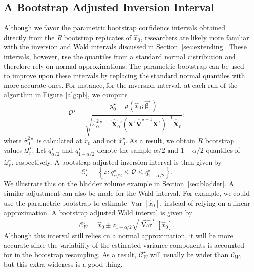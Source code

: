\documentclass[useAMS,usenatbib,usegraphicx,referee]{biom}\usepackage[]{graphicx}\usepackage[]{color}
\newcommand{\var}{\operatorname{Var}}
\newcommand{\trans}{\ensuremath{^\prime}}
\newcommand{\boot}{\star}
\newcommand{\X}{\ensuremath{\bm{X}}}
\begin{document}
\subsection{A Bootstrap Adjusted Inversion Interval}
\label{sec:inversion-adjusted}
Although we favor the parametric bootstrap confidence intervals obtained directly from the $R$ bootstrap replicates of $\widehat{x}_0$, researchers are likely more familiar with the inversion and Wald intervals discussed in Section~\ref{sec:extending}. These intervals, however, use the quantiles from a standard normal distribution and therefore rely on normal approximations. The parametric bootstrap can be used to improve upon these intervals by replacing the standard normal quantiles with more accurate ones. For instance, for the inversion interval, at each run of the algorithm in Figure~\ref{alg:pb}, we compute
\[
  \mathcal{Q}^\boot = \frac{y_0^\boot - \mu\left(\widehat{x}_0; \widehat{\bm{\beta}}^\boot\right)}{\sqrt{\widehat{\sigma}_0^{2\boot} + \widehat{\X}_0\trans\left(\X\trans\widehat{\bm{V}}^{\boot-1}\X\trans\right)^{-1}\widehat{\X}_0}},
\]
where $\widehat{\sigma}_0^{2\boot}$ is calculated at $\widehat{x}_0$ and not $\widehat{x}_0^\boot$. As a result, we obtain $R$ bootstrap values $\mathcal{Q}_r^\boot$. Let $q_{\alpha/2}^\boot$ and $q_{1-\alpha/2}^\boot$ denote the sample $\alpha/2$ and $1-\alpha/2$ quantiles of $\mathcal{Q}_r^\boot$, respectively. A bootstrap adjusted inversion interval is then given by
\begin{equation}
\label{eqn:inversion-boot}
  \mathcal{C}^\boot_I = \left\{ x: q_{\alpha/2}^\boot \le \mathcal{Q} \le q_{1-\alpha/2}^\boot \right\}.
\end{equation}
We illustrate this on the bladder volume example in Section~\ref{sec:bladder}. A similar adjustment can also be made for the Wald interval. For example, we could use the parametric bootstrap to estimate $\var\left[\widehat{x}_0\right]$, instead of relying on a linear approximation. A bootstrap adjusted Wald interval is given by
\begin{equation}
\label{eqn:cal-lmm-iwald-boot}
  \mathcal{C}^\boot_W = \widehat{x}_0 \pm z_{1-\alpha/2}\sqrt{\widehat{\var}^\boot\left[\widehat{x}_0\right]}.
\end{equation}
Although this interval still relies on a normal approximation, it will be more accurate since the variability of the estimated variance components is accounted for in the bootstrap resampling. As a result, $\mathcal{C}^\boot_W$ will usually be wider than $\mathcal{C}_W$, but this extra wideness is a good thing.
\end{document}
